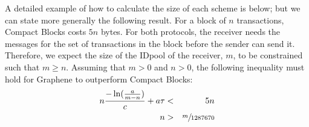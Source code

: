 

A detailed example of how to calculate the size of each scheme is below; but we can state more generally the following result. For a
block of $n$ transactions, Compact Blocks costs $5n$ bytes. For both
protocols, the receiver needs the \inv messages for the set of
transactions in the block before the sender can send it. Therefore, we
expect the size of the IDpool of the receiver, $m$, to be constrained
such that $m \geq n$. Assuming that $m > 0$ and $n > 0$, the following
inequality must hold for Graphene to outperform Compact Blocks: \vspace{0.5ex}
%
\begin{eqnarray}
n\frac{-\ln(\frac{a}{m-n})}{c}+ a\tau &<& 5n\\
n&>& \sfrac{m}{1287670}
\end{eqnarray}
%
